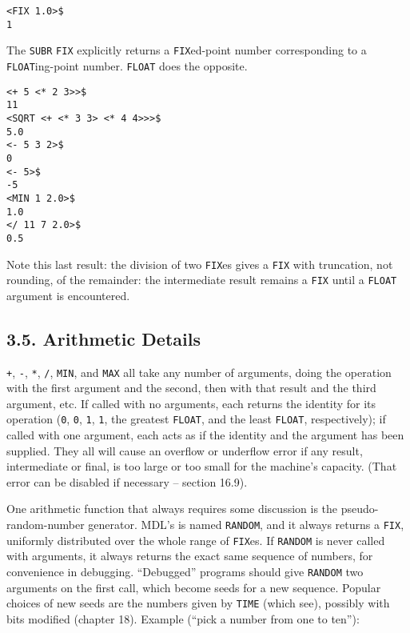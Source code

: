 \documentclass[a4paper,]{article}
\begin{document}
\begin{verbatim}
<FIX 1.0>$
1
\end{verbatim}

The \texttt{SUBR} \texttt{FIX} explicitly returns a \texttt{FIX}ed-point number corresponding to a \texttt{FLOAT}ing-point
number. \texttt{FLOAT} does the opposite.

\begin{verbatim}
<+ 5 <* 2 3>>$
11
<SQRT <+ <* 3 3> <* 4 4>>>$
5.0
<- 5 3 2>$
0
<- 5>$
-5
<MIN 1 2.0>$
1.0
</ 11 7 2.0>$
0.5
\end{verbatim}

Note this last result: the division of two \texttt{FIX}es gives a \texttt{FIX} with truncation, not rounding, of the
remainder: the intermediate result remains a \texttt{FIX} until a \texttt{FLOAT} argument is encountered.

\subsection{3.5. Arithmetic Details}\label{arithmetic-details}

\texttt{+}, \texttt{-}, \texttt{*}, \texttt{/}, \texttt{MIN}, and \texttt{MAX} all take any number of arguments, doing the
operation with the first argument and the second, then with that result and the third argument, etc. If called with no
arguments, each returns the identity for its operation (\texttt{0}, \texttt{0}, \texttt{1}, \texttt{1}, the greatest
\texttt{FLOAT}, and the least \texttt{FLOAT}, respectively); if called with one argument, each acts as if the identity and
the argument has been supplied. They all will cause an overflow or underflow error if any result, intermediate or final, is
too large or too small for the machine's capacity. (That error can be disabled if necessary -- section 16.9).

One arithmetic function that always requires some discussion is the pseudo-random-number generator. MDL's is named
\texttt{RANDOM}, and it always returns a \texttt{FIX}, uniformly distributed over the whole
range of \texttt{FIX}es. If \texttt{RANDOM} is never called with arguments, it always returns the exact same sequence of
numbers, for convenience in debugging. ``Debugged'' programs should give \texttt{RANDOM} two arguments on the first call,
which become seeds for a new sequence. Popular choices of new seeds are the numbers given by \texttt{TIME} (which see),
possibly with bits modified (chapter 18). Example (``pick a number from one to ten''):
\end{document}
